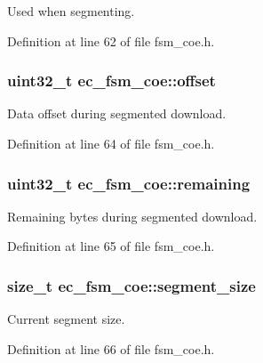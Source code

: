 \-Used when segmenting. 



\-Definition at line 62 of file fsm\-\_\-coe.\-h.

\subsubsection[{offset}]{\setlength{\rightskip}{0pt plus 5cm}uint32\-\_\-t {\bf ec\-\_\-fsm\-\_\-coe\-::offset}}\label{structec__fsm__coe_ae6154dddb5d2a111661d2ecbc866a66d}


\-Data offset during segmented download. 



\-Definition at line 64 of file fsm\-\_\-coe.\-h.

\subsubsection[{remaining}]{\setlength{\rightskip}{0pt plus 5cm}uint32\-\_\-t {\bf ec\-\_\-fsm\-\_\-coe\-::remaining}}\label{structec__fsm__coe_a90921faef4f8ccada6bf621357f070d2}


\-Remaining bytes during segmented download. 



\-Definition at line 65 of file fsm\-\_\-coe.\-h.

\subsubsection[{segment\-\_\-size}]{\setlength{\rightskip}{0pt plus 5cm}size\-\_\-t {\bf ec\-\_\-fsm\-\_\-coe\-::segment\-\_\-size}}\label{structec__fsm__coe_ad25b5b2158356b9ed09fe6d3cd21b99c}


\-Current segment size. 



\-Definition at line 66 of file fsm\-\_\-coe.\-h.

